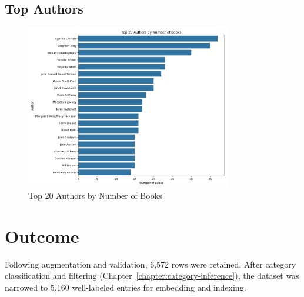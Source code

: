 \subsection{Top Authors}
\label{sec:top-authors}
\begin{figure}[H]
    \centering
    \includegraphics[width=0.8\textwidth]{figures/top_authors.png}
    \caption{Top 20 Authors by Number of Books}
    \label{fig:top-authors}
\end{figure}

\section{Outcome}
\label{sec:exploration-outcome}

Following augmentation and validation, 6,572 rows were retained. After category classification and filtering (Chapter~\ref{chapter:category-inference}), the dataset was narrowed to 5,160 well-labeled entries for embedding and indexing.
